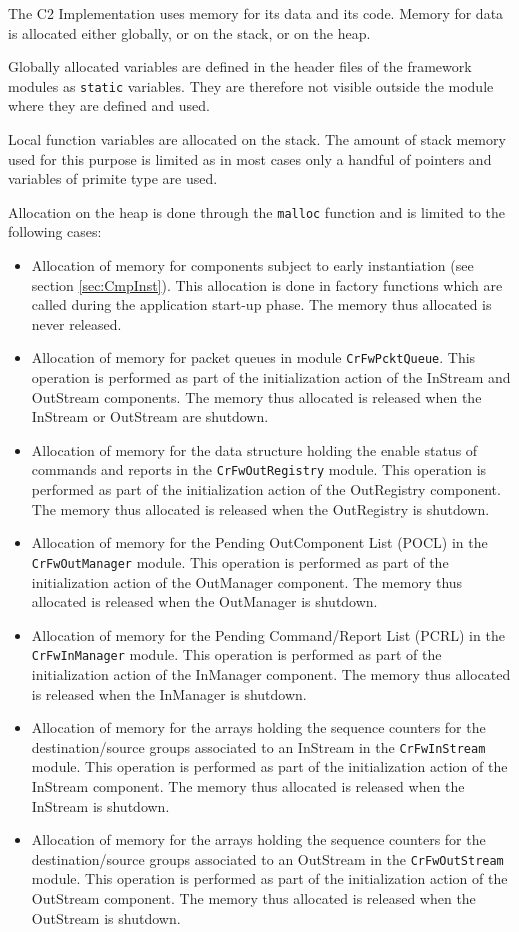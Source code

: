 \documentclass{pnp_article}
\begin{document}
The C2 Implementation uses memory for its data and its code. Memory for data is allocated either globally, or on the stack, or on the heap.

Globally allocated variables are defined in the header files of the framework modules as \texttt{static} variables. They are therefore not visible outside the module where they are defined and used.

Local function variables are allocated on the stack. The amount of stack memory used for this purpose is limited as in most cases only a handful of pointers and variables of primite type are used.

Allocation on the heap is done through the \texttt{malloc} function and is limited to the following cases:

\begin{itemize}
\item Allocation of memory for components subject to early instantiation (see section \ref{sec:CmpInst}). This allocation is done in factory functions which are called during the application start-up phase. The memory thus allocated is never released.
\item Allocation of memory for packet queues in module \texttt{CrFwPcktQueue}. This operation is performed as part of the initialization action of the InStream and OutStream components. The memory thus allocated is released when the InStream or OutStream are shutdown.
\item Allocation of memory for the data structure holding the enable status of commands and reports in the \texttt{CrFwOutRegistry} module. This operation is performed as part of the initialization action of the OutRegistry component. The memory thus allocated is released when the OutRegistry is shutdown.
\item Allocation of memory for the Pending OutComponent List (POCL) in the \texttt{CrFwOutManager} module. This operation is performed as part of the initialization action of the OutManager component. The memory thus allocated is released when the OutManager is shutdown.
\item Allocation of memory for the Pending Command/Report List (PCRL) in the \texttt{CrFwInManager} module. This operation is performed as part of the initialization action of the InManager component. The memory thus allocated is released when the InManager is shutdown.
\item Allocation of memory for the arrays holding the sequence counters for the destination/source groups associated to an InStream in the \texttt{CrFwInStream} module. This operation is performed as part of the initialization action of the InStream component. The memory thus allocated is released when the InStream is shutdown.
\item Allocation of memory for the arrays holding the sequence counters for the destination/source groups associated to an OutStream in the \texttt{CrFwOutStream} module. This operation is performed as part of the initialization action of the OutStream component. The memory thus allocated is released when the OutStream is shutdown.
\end{itemize}
\end{document}

